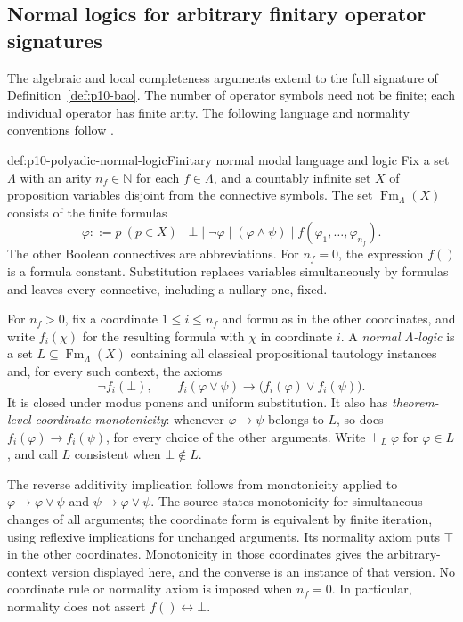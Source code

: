 
\subsection{Normal logics for arbitrary finitary operator signatures}
\label{sec:p10-polyadic-modal-algebras}

The algebraic and local completeness arguments extend to the full
signature of Definition~\ref{def:p10-bao}.  The number of operator
symbols need not be finite; each individual operator has finite arity.
The following language and normality conventions follow
\cite[preprint \S2, pp.~4, 6]{Venema2005Preprint}.

\begin{hbdefinition}{def:p10-polyadic-normal-logic}{Finitary normal modal language and logic}
Fix a set \(\Lambda\) with an arity \(n_f\in\mathbb N\) for each
\(f\in\Lambda\), and a countably infinite set \(X\) of proposition
variables disjoint from the connective symbols.
The set \(\operatorname{Fm}_\Lambda(X)\) consists of the finite formulas
\[
 \varphi ::= p\ (p\in X)\mid\bot\mid\neg\varphi
       \mid(\varphi\wedge\psi)\mid f(\varphi_1,\ldots,\varphi_{n_f}).
\]
The other Boolean connectives are abbreviations.
For \(n_f=0\), the expression \(f()\) is a formula constant.
Substitution replaces variables simultaneously by formulas and leaves
every connective, including a nullary one, fixed.

For \(n_f>0\), fix a coordinate \(1\leq i\leq n_f\) and formulas in the other
coordinates, and write \(f_i(\chi)\) for the resulting formula with
\(\chi\) in coordinate \(i\).
A \emph{normal \(\Lambda\)-logic} is a set
\(L\subseteq\operatorname{Fm}_\Lambda(X)\) containing all classical
propositional tautology instances and, for every such context, the axioms
\[
 \neg f_i(\bot),\qquad
 f_i(\varphi\vee\psi)\to
                 \bigl(f_i(\varphi)\vee f_i(\psi)\bigr).
\]
It is closed under modus ponens and uniform substitution.
It also has \emph{theorem-level coordinate monotonicity}: whenever
\(\varphi\to\psi\) belongs to \(L\), so does
\(f_i(\varphi)\to f_i(\psi)\), for every choice of the other arguments.
Write \(\vdash_L\varphi\) for \(\varphi\in L\), and call \(L\)
consistent when \(\bot\notin L\).

The reverse additivity implication follows from monotonicity applied
to \(\varphi\to\varphi\vee\psi\) and
\(\psi\to\varphi\vee\psi\).
The source states monotonicity for simultaneous changes of all arguments;
the coordinate form is equivalent by finite iteration, using reflexive
implications for unchanged arguments.  Its normality axiom puts
\(\top\) in the other coordinates.  Monotonicity in those coordinates
gives the arbitrary-context version displayed here, and the converse is
an instance of that version.
No coordinate rule or normality axiom is imposed when \(n_f=0\).
In particular, normality does not assert \(f()\leftrightarrow\bot\).


\end{hbdefinition}
